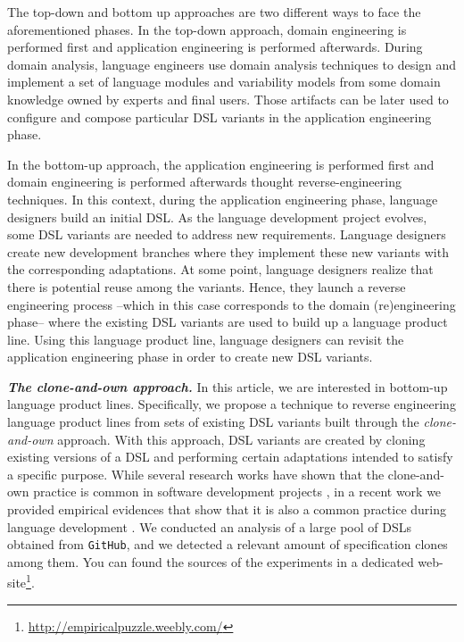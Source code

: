 The top-down and bottom up approaches are two different ways to face the aforementioned phases. In the top-down approach, domain engineering is performed first and application engineering is performed afterwards. During domain analysis, language engineers use domain analysis techniques to design and implement a set of language modules and variability models from some domain knowledge owned by experts and final users. Those artifacts can be later used to configure and compose particular DSL variants in the application engineering phase.

In the bottom-up approach, the application engineering is performed first and domain engineering is performed afterwards thought reverse-engineering techniques. In this context, during the application engineering phase, language designers build an initial DSL. As the language development project evolves, some DSL variants are needed to address new requirements. Language designers create new development branches where they implement these new variants with the corresponding adaptations. At some point, language designers realize that there is potential reuse among the variants. Hence, they launch a reverse engineering process --which in this case corresponds to the domain (re)engineering phase-- where the existing DSL variants are used to build up a language product line. Using this language product line, language designers can revisit the application engineering phase in order to create new DSL variants.

\vspace{2mm}
\textit{\textbf{The clone-and-own approach.}} In this article, we are interested in bottom-up language product lines. Specifically, we propose a technique to reverse engineering language product lines from sets of existing DSL variants built through the \textit{clone-and-own} approach. With this approach, DSL variants are created by cloning existing versions of a DSL and performing certain adaptations intended to satisfy a specific purpose. While several research works have shown that the clone-and-own practice is common in software development projects \cite{Mayrand:1996,Rubin:2015}, in a recent work we provided empirical evidences that show that it is also a common practice during language development \cite{MendezAcuna:2016}. We conducted an analysis of a large pool of DSLs obtained from \texttt{GitHub}, and we detected a relevant amount of specification clones among them. You can found the sources of the experiments in a dedicated web-site\footnote{\url{http://empiricalpuzzle.weebly.com/}}.

